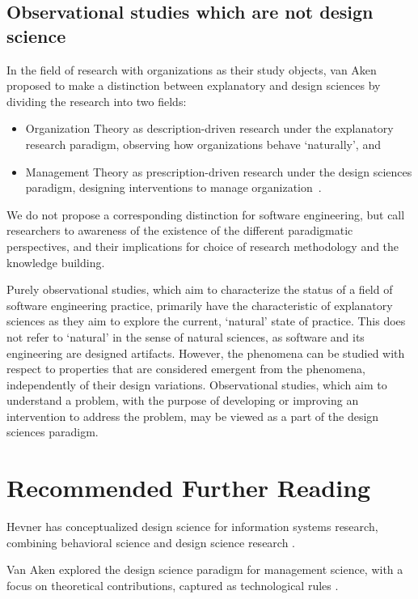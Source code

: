 \documentclass[graybox]{svmult}
\begin{document}
\subsection{Observational studies which are not design science }
In the field of research with organizations as their study objects, van Aken proposed to make a distinction between explanatory and design sciences by dividing the research into two fields: 
\begin{itemize}
\item Organization Theory as description-driven research under the explanatory research paradigm, observing how organizations behave `naturally', and 
\item Management Theory as prescription-driven research under the design sciences paradigm, designing interventions to manage organization~\cite{van_aken_management_2004}.  
\end{itemize}

We do not propose a corresponding distinction for software engineering, but call researchers to awareness of the existence of the different paradigmatic perspectives, and their implications for choice of research methodology and the knowledge building.

Purely observational studies, which aim to characterize the status of a field of software engineering practice, primarily have the characteristic of explanatory sciences as they aim to explore the current, `natural'  state of practice. This does not refer to `natural' in the sense of natural sciences, as software and its engineering are designed artifacts. However, the phenomena can be studied with respect to properties that are considered emergent from the phenomena, independently of their design variations. Observational studies, which aim to understand a problem, with the purpose of developing or improving an intervention to address the problem, may be viewed as a part of the design sciences paradigm. 




\section{Recommended Further Reading}

Hevner has conceptualized design science for information systems research, combining behavioral science and design science research \cite{hevner_design_2004,hevner_design_2010}.

Van Aken explored the design science paradigm for management science, with a focus on theoretical contributions, captured as technological rules \cite{van_aken_management_2004,van_aken_management_2005}. 
\end{document}
